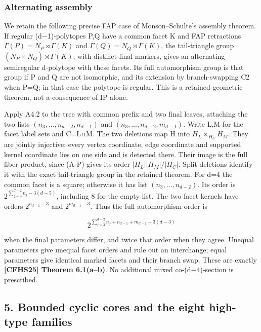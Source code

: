 \documentclass[
  11pt,
  a4paper,
]{article}
\begin{document}
\subsubsection{Alternating assembly}\label{alternating-assembly}

We retain the following precise FAP case of Monson--Schulte's assembly
theorem. If regular (d−1)-polytopes P,Q have a common facet K and FAP
retractions \(\Gamma(P)=N_P\rtimes\Gamma(K)\) and
\(\Gamma(Q)=N_Q\rtimes\Gamma(K)\), the tail-triangle group
\((N_P\times N_Q)\rtimes\Gamma(K)\), with distinct final markers, gives
an alternating semiregular d-polytope with these facets. Its full
automorphism group is that group if P and Q are not isomorphic, and its
extension by branch-swapping C2 when P=Q; in that case the polytope is
regular. This is a retained geometric theorem, not a consequence of IP
alone.

Apply A4.2 to the tree with common prefix and two final leaves,
attaching the two lists \((n_3,\ldots,n_{d-2},n_{d-1})\) and
\((n_3,\ldots,n_{d-2},m_{d-1})\). Write L,M for the facet label sets and
C=L∩M. The two deletions map H into \(H_L\times_{H_C}H_M\). They are
jointly injective: every vertex coordinate, edge coordinate and
supported kernel coordinate lies on one side and is detected there.
Their image is the full fiber product, since (A-P) gives its order
\(|H_L||H_M|/|H_C|\). Split deletions identify it with the exact
tail-triangle group in the retained theorem. For d=4 the common facet is
a square; otherwise it has list \((n_3,\ldots,n_{d-2})\). Its order is
\(2^{\sum_{j=3}^{d-2}n_j-3(d-5)}\), including 8 for the empty list. The
two facet kernels have orders \(2^{n_{d-1}-3}\) and \(2^{m_{d-1}-3}\).
Thus the full automorphism order is

\[
 2^{\sum_{j=3}^{d-2}n_j+n_{d-1}+m_{d-1}-3(d-3)}
\]

when the final parameters differ, and twice that order when they agree.
Unequal parameters give unequal facet orders and rule out an
interchange; equal parameters give identical marked facets and their
branch swap. These are exactly \textbf{{[}CFHS25{]} Theorem 6.1(a--b)}.
No additional mixed co-(d−4)-section is prescribed.

\subsection{5. Bounded cyclic cores and the eight high-type
families}\label{bounded-cyclic-cores-and-the-eight-high-type-families}
\end{document}
